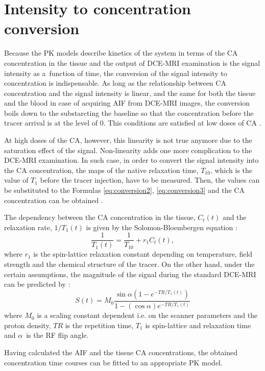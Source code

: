 \section{Intensity to concentration conversion}
Because the PK models describe kinetics of the system in terms of the CA concentration in the tissue and the output of DCE-MRI examination is the signal intensity as a~function of time, the conversion of the signal intensity to concentration is indispensable. 
As long as the relationship between CA concentration and the signal intensity  is linear, and the same for both the tissue and the blood in case of acquiring AIF from DCE-MRI images, the conversion boils down to the substarcting the baseline so that the concentration before the tracer arrival is at the level of 0. This conditions are satisfied at low doses of CA \cite{khalifa2014models}.

At high doses of the CA, however, this linearity is not true anymore due to the saturation effect of the signal. Non-linearity adds one more complication to the DCE-MRI examination. In such case, in order to convert the signal intensity into the CA concentration, the maps of the native relaxation time, $T_{10}$, which is the value of $T_1$ before the tracer injection, have to be measured. Then, the values can be substituted to the Formulas \ref{eq:conversion2}, \ref{eq:conversion3} and the CA concentration can be obtained \cite{khalifa2014models, jackson2005dynamic, barnes2012practical}.


The dependency between the CA concentration in the tissue, $C_t(t)$  and the relaxation rate, $1/T_1(t)$ is given by the Solomon-Bloembergen equation \cite{jackson2005dynamic}:
 \begin{equation}
 \frac{1}{T_1(t)} = \frac{1}{T_{10}}+r_1C_t(t),
 \label{eq:conversion2}
 \end{equation}
where $r_1$ is the spin-lattice relaxation constant depending on temperature, field strength and the chemical structure of the tracer. On the other hand, under the certain assumptions, the magnitude of the signal during the standard DCE-MRI can be predicted by \cite{khalifa2014models, jackson2005dynamic}:
  \begin{equation}
 S(t)  = M_0\frac{\sin\alpha(1-e^{-TR/T_1(t)})}      {1-(\cos\alpha)e^{-TR/T_1(t)}}
 \label{eq:conversion3}
 \end{equation} 
where $M_0$ is a scaling constant dependent i.e. on the scanner parameters and the proton density, $TR$ is the repetition time, $T_1$ is spin-lattice and relaxation time and $\alpha$~is the RF flip angle.

Having calculated the AIF and the tissue CA concentrations, the obtained concentration time courses can be fitted to an appropriate PK model. 
